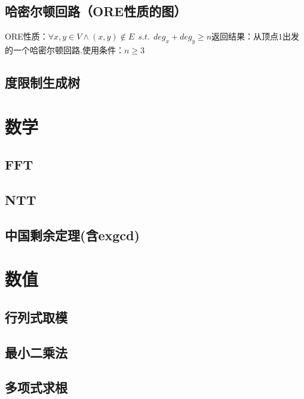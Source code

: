 \documentclass[landscape,a4paper]{article}
\begin{document}
\begin{spacing}{0.3}
\begin{multicols}{2}
\subsection{哈密尔顿回路（ORE性质的图）}
ORE性质：$\forall x,y \in V \wedge (x,y) \notin E \ \ s.t. \ \ deg_x+deg_y \geq n$返回结果：从顶点$1$出发的一个哈密尔顿回路.使用条件：$n \geq 3$

\subsection{度限制生成树}



		
	\section{数学}
		\subsection{FFT}
		
		\subsection{NTT}
		
		\subsection{中国剩余定理(含exgcd)}
		
		


	\section{数值}
	\subsection{行列式取模}
	
	\subsection{最小二乘法}
	
	\subsection{多项式求根}
	

\end{multicols}
\end{spacing}
\end{document}
